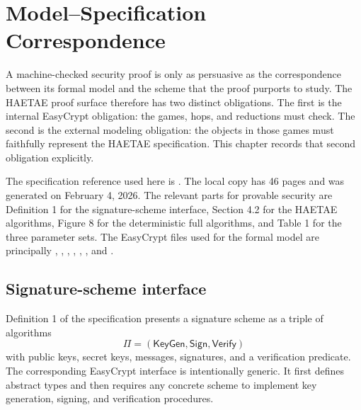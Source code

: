 \chapter{Model--Specification Correspondence}
\label{ch:model-spec-correspondence}

A machine-checked security proof is only as persuasive as the correspondence
between its formal model and the scheme that the proof purports to study.  The
HAETAE proof surface therefore has two distinct obligations.  The first is the
internal EasyCrypt obligation: the games, hops, and reductions must check.  The
second is the external modeling obligation: the objects in those games must
faithfully represent the HAETAE specification.  This chapter records that second
obligation explicitly.

The specification reference used here is 
\cite{haetae-v260204}.  The local copy has 46 pages and was generated on
February 4, 2026.  The relevant parts for provable security are Definition 1 for
the signature-scheme interface, Section 4.2 for the HAETAE algorithms, Figure 8
for the deterministic full algorithms, and Table 1 for the three parameter
sets.  The EasyCrypt files used for the
formal model are principally , ,
, , ,
, and .

\section{Signature-scheme interface}
\label{sec:model-spec-signature-interface}

Definition 1 of the specification presents a signature scheme as a triple of
algorithms
\[
  \Pi=(\mathsf{KeyGen},\mathsf{Sign},\mathsf{Verify})
\]
with public keys, secret keys, messages, signatures, and a verification
predicate.  The corresponding EasyCrypt interface is intentionally generic.  It
first defines abstract types and then requires any concrete scheme to implement
key generation, signing, and verification procedures.

